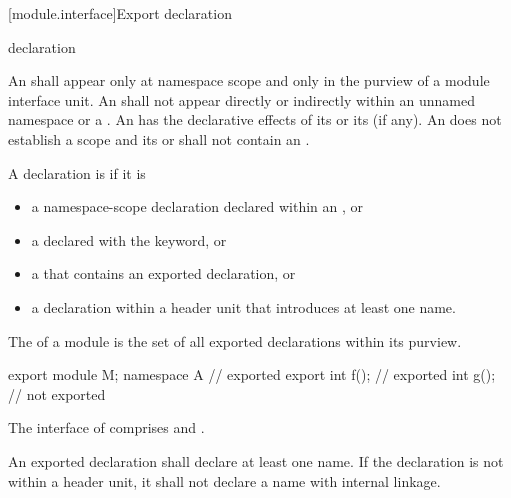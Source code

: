 [module.interface]{Export declaration}%

\begin{bnf}
\br
     declaration\br 
     \terminal{\{}  \terminal{\}} 
\end{bnf}

\pnum
An  shall appear only
at namespace scope and only in the purview of a module interface unit. 
An  shall not appear directly
or indirectly within an unnamed namespace
or a .
An 
has the declarative effects of its 
or its  (if any).
An  does not
establish a scope and its 
or 
shall not contain an .

\pnum
A declaration is  if it is
\begin{itemize}
\item a namespace-scope declaration declared within an
      , or
\item a  declared with
      the  keyword, or
\item a  that contains an
      exported declaration, or
\item a declaration within a header unit
      that introduces at least one name.
\end{itemize}
The  of a module 
is the set of all exported declarations within its purview.
\begin{example}
\begin{codeblock}
export module M;
namespace A {                   // exported
  export int f();               // exported
  int g();                      // not exported
}
\end{codeblock}
The interface of  comprises  and .
\end{example}

\pnum
An exported declaration shall declare at least one name.
If the declaration is not within a header unit,
it shall not declare a name with internal linkage.

